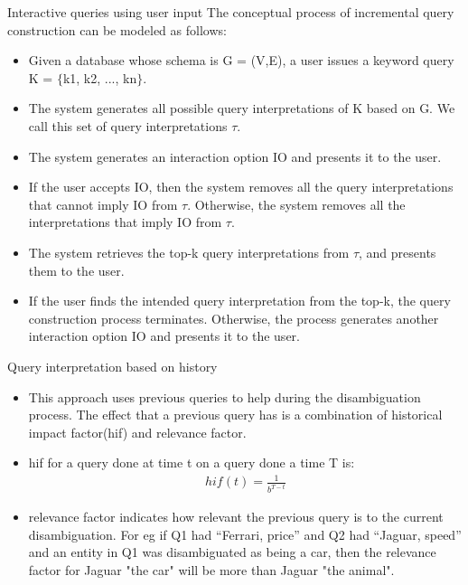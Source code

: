 \documentclass[pdf,11pt]{beamer}
\begin{document}
\begin{frame}{Interactive queries using user input}
The conceptual process of incremental query construction can be modeled as follows:
\begin{itemize}
\item
Given a database whose schema is G = (V,E), a user
issues a keyword query K = $\{$k1, k2, ..., kn$\}$.
\item The system generates all possible query interpretations of K based on G. We call this set of query interpretations $\tau$.
\item The system generates an interaction option IO and presents it to the user.
\item If the user accepts IO, then the system removes all the query interpretations that cannot imply IO from $\tau$. Otherwise, the system removes all the interpretations that imply IO from $\tau$.
\item The system retrieves the top-k query interpretations
from $\tau$, and presents them to the user.
\item If the user finds the intended query interpretation from the top-k, the query construction process terminates. Otherwise, the process generates another interaction option IO and
presents it to the user.
\end{itemize}
\end{frame}

\begin{frame}{Query interpretation based on history}
\begin{itemize}
\item
This approach uses previous queries to help during the disambiguation process. The effect that a previous query has is a combination of historical impact factor(hif) and relevance factor.

\item hif for a query done at time t on a query done a time T is:
\begin{align}
hif(t) = \frac{1}{b^{T-t}}
\end{align}

\item relevance factor indicates how relevant the previous query is to the current disambiguation. For eg if Q1 had “Ferrari, price” and Q2 had “Jaguar, speed” and an entity in Q1 was disambiguated as being a car, then the relevance factor for Jaguar "the car" will be more than Jaguar "the animal".

\end{itemize}
\end{frame}
\end{document}
